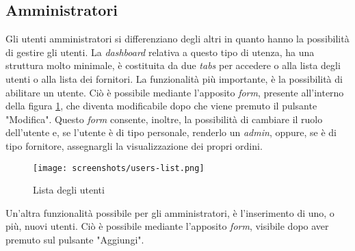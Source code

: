 \newpage
\subsection{Amministratori}
Gli utenti amministratori si differenziano degli altri in quanto hanno la possibilità di gestire gli utenti.
La \emph{dashboard} relativa a questo tipo di utenza, ha una struttura molto minimale, è costituita da due \emph{tabs} per accedere o alla lista degli utenti o alla lista dei fornitori.
La funzionalità più importante, è la possibilità di abilitare un utente. 
Ciò è possibile mediante l'apposito \emph{form}, presente all'interno della figura \ref{fig:users-list}, che diventa modificabile dopo che viene premuto il pulsante "Modifica".
Questo \emph{form} consente, inoltre, la possibilità di cambiare il ruolo dell'utente e, se l'utente è di tipo personale, renderlo un \emph{admin}, oppure, se è di tipo fornitore, assegnargli la visualizzazione dei propri ordini.

\begin{figure}[!ht]
  \begin{center}
    \texttt{[image: screenshots/users-list.png]}
    \caption{Lista degli utenti}
    \label{fig:users-list}
  \end{center}
\end{figure}

Un'altra funzionalità possibile per gli amministratori, è l'inserimento di uno, o più, nuovi utenti.
Ciò è possibile mediante l'apposito \emph{form}, visibile dopo aver premuto sul pulsante "Aggiungi".